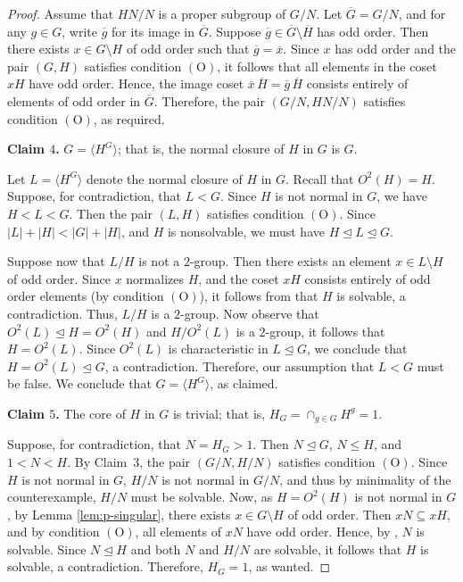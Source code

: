 \documentclass[twoside,a4paper,reqno,11pt]{amsart}
\newcommand{\<}{\langle}
\renewcommand{\>}{\rangle}
\newcommand{\leqs}{\leqslant}
\newcommand{\OO}{\mathrm {(O)}}
\renewcommand{\leq}{\leqs}
\renewcommand{\:}{\colon}
\theoremstyle{definition}
\begin{document}
\begin{proof}
Assume that $ HN/N $ is a  proper subgroup of $ G/N $. Let $ \overline{G} = G/N $, and for any $ g \in G $, write $ \overline{g} $ for its image in $ \overline{G} $.  Suppose $ \overline{g} \in \overline{G} \setminus \overline{H} $ has odd order. Then there exists $x\in G\setminus H$ of odd order such that $ \overline{g} = \overline{x}$. Since $ x $ has odd order and the pair $ (G,H) $ satisfies condition $ \OO $, it follows that all elements in the coset $ xH $ have odd order.
Hence, the image coset $ \overline{x} \, \overline{H} = \overline{g} \, \overline{H} $ consists entirely of elements of odd order in $ \overline{G} $. Therefore, the pair $ (G/N, HN/N) $ satisfies condition $ \OO $, as required.


\smallskip
\textbf{Claim $4$.}  $ G = \langle H^G \rangle $; that is, the normal closure of $ H $ in $ G $ is  $ G $.
\smallskip

Let $ L = \langle H^G \rangle $ denote the normal closure of $ H $ in $ G $. Recall that $O^2(H)=H$. Suppose, for contradiction, that $ L < G $. Since $ H $ is not normal in $ G $, we have $ H < L < G $. Then the pair $ (L, H) $ satisfies condition $ \OO $. Since $|L|+|H|<|G|+|H|$, and $H$ is nonsolvable, we must have $ H \trianglelefteq L \trianglelefteq G $.

Suppose now that $ L/H $ is not a $ 2 $-group. Then there exists an element $ x \in L \setminus H $ of odd order. Since $ x $ normalizes $ H $, and the coset $ xH $ consists entirely of odd order elements (by condition $ \OO $), it follows from \cite[Theorem~B]{GN} that $ H $ is solvable, a contradiction. Thus, $ L/H $ is a $ 2 $-group. Now observe that $ O^2(L) \unlhd H=O^2(H) $ and $H/O^2(L)$ is a $2$-group, it follows that $H=O^2(L)$. Since $ O^2(L) $ is characteristic in $ L \trianglelefteq G $, we conclude that $ H=O^2(L) \trianglelefteq G $, a contradiction.
Therefore, our assumption that $ L < G $ must be false. We conclude that $ G = \langle H^G \rangle $, as claimed.



\smallskip
\textbf{Claim $5$.}  
The core of $H$ in $G$ is trivial; that is, $H_G = \cap_{g\in G}H^g=1$.

\smallskip
Suppose, for contradiction, that $N = H_G > 1$. Then $ N \trianglelefteq G $, $ N \leq H $, and $ 1 < N < H $. By Claim~3, the pair $(G/N, H/N)$ satisfies condition $ \OO$. Since $H$ is not normal in $ G$,  $H/N$ is not normal in $G/N$, and thus by minimality of the counterexample, $H/N $ must be solvable.
Now, as $H = O^2(H)$ is not normal in $G$, by Lemma \ref{lem:p-singular}, there exists $ x \in G \setminus H $  of odd order. Then $xN \subseteq xH $, and by condition $ \OO$, all elements of $xN $ have odd order. Hence, by \cite[Theorem~B]{GN}, $N$ is solvable.
Since $N \trianglelefteq H $ and both $ N $ and $H/N$ are solvable, it follows that $ H $ is solvable, a contradiction. Therefore, $ H_G = 1$, as wanted.


\end{proof}
\end{document}

